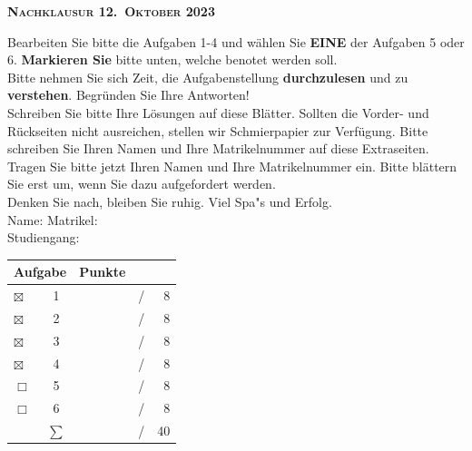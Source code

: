 \documentclass[a4paper]{article}
\begin{document}
% 

{
\kopf
}
 \begin{center}
   {\Large {\bfseries\scshape Nachklausur 12.~Oktober 2023}}
\end{center}

\enlargethispage*{40mm}

Bearbeiten Sie bitte die Aufgaben 1-4 und w\"ahlen Sie {\bfseries
  \sffamily EINE} der Aufgaben 5 oder 6. {\bfseries Markieren Sie}
bitte unten, welche benotet werden soll. 
\\
Bitte nehmen Sie sich Zeit, die Aufgabenstellung {\bfseries
  durchzulesen} und zu {\bfseries verstehen}. Begr\"unden Sie Ihre
Antworten!
\\
Schreiben Sie bitte Ihre L\"osungen auf diese Bl\"atter. 
Sollten die Vorder- und R\"uckseiten nicht ausreichen, stellen wir
Schmierpapier zur Verf\"ugung.
Bitte schreiben Sie Ihren Namen und Ihre Matrikelnummer auf diese
Extraseiten. 
\\
Tragen Sie bitte jetzt Ihren Namen und Ihre Matrikelnummer ein.
Bitte bl\"attern Sie erst um, wenn Sie dazu aufgefordert werden.
\\[\baselineskip] %
Denken Sie nach, bleiben Sie ruhig. Viel Spa"s und Erfolg.
\\[\baselineskip] %
Name: \underline{\hspace{50mm}} \hfill
\mbox{Matrikel: \underline{\hspace{40mm}}}
\\[.5\baselineskip]
\mbox{} \hfill \mbox{Studiengang: \underline{\hspace{40mm}}}
\\[\baselineskip] %
\begin{center}
  \begin{tabular}{l c | rcr}
    \multicolumn{2}{r|}{Aufgabe} & Punkte \\
    \hline
    $\boxtimes$ & 1 & & / & 8 \\
    $\boxtimes$ & 2 & & / & 8 \\
    $\boxtimes$ & 3 & & / & 8 \\
    $\boxtimes$ & 4 & & / & 8 \\
    $\Box$ & 5 & & / & 8 \\
    $\Box$ & 6 & & / & 8 \\
    \hline
    & $\sum$ & & / & 40
  \end{tabular}
\end{center}
\vfill
\end{document}
